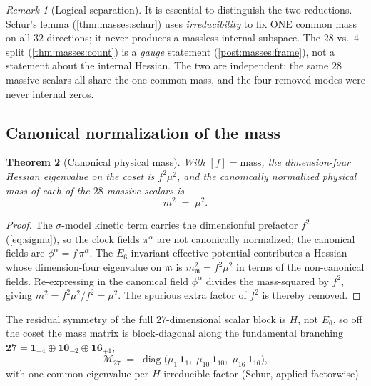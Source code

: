 \documentclass[11pt]{article}
\theoremstyle{plain}
\newtheorem{theorem}{Theorem}[section]
\theoremstyle{definition}
\theoremstyle{remark}
\newtheorem{remark}[theorem]{Remark}
\begin{document}
\begin{remark}[Logical separation]\label{rmk:masses:separation}
It is essential to distinguish the two reductions. Schur's lemma
(\autoref{thm:masses:schur}) uses \emph{irreducibility} to fix ONE common mass
on all $32$ directions; it never produces a massless internal subspace. The
$28$ vs.\ $4$ split (\autoref{thm:masses:count}) is a \emph{gauge} statement
(\autoref{post:masses:frame}), not a statement about the internal Hessian. The
two are independent: the same $28$ massive scalars all share the one common
mass, and the four removed modes were never internal zeros.
\end{remark}

\subsection{Canonical normalization of the mass}
\label{sec:masses:canonical}

\begin{theorem}[Canonical physical mass]\label{thm:masses:canonical}
\label{thm:MassSpectrum}
\label{thm:gravity:mass}
With $[f]=\text{mass}$, the dimension-four Hessian eigenvalue on the coset is
$f^{2}\mu^{2}$, and the canonically normalized physical mass of each of the
$28$ massive scalars is
\begin{equation}\label{eq:masses:m2}
  m^{2} \;=\; \mu^{2}.
\end{equation}
\end{theorem}

\begin{proof}
The $\sigma$-model kinetic term carries the dimensionful prefactor $f^{2}$
(\autoref{eq:sigma}), so the clock fields $\pi^{\alpha}$ are not canonically
normalized; the canonical fields are $\phi^{\alpha}=f\,\pi^{\alpha}$. The
$E_{6}$-invariant effective potential contributes a Hessian whose dimension-four
eigenvalue on $\mathfrak m$ is $m_{\mathfrak m}^{2}=f^{2}\mu^{2}$ in terms of
the non-canonical fields. Re-expressing in the canonical field $\phi^{\alpha}$
divides the mass-squared by $f^{2}$, giving $m^{2}=f^{2}\mu^{2}/f^{2}=\mu^{2}$.
The spurious extra factor of $f^{2}$ is thereby removed.
\end{proof}

The residual symmetry of the full $27$-dimensional scalar block is $H$, not
$E_{6}$, so off the coset the mass matrix is block-diagonal along the
fundamental branching
$\mathbf{27}=\mathbf 1_{+4}\oplus\mathbf{10}_{-2}\oplus\mathbf{16}_{+1}$,
\begin{equation}\label{eq:masses:27block}
  \mathcal{M}_{27}
  \;=\;
  \operatorname{diag}\!\bigl(\mu_{1}\,\mathbf 1_{1},\;
  \mu_{10}\,\mathbf 1_{10},\;\mu_{16}\,\mathbf 1_{16}\bigr),
\end{equation}
with one common eigenvalue per $H$-irreducible factor (Schur, applied factorwise).
\end{document}
